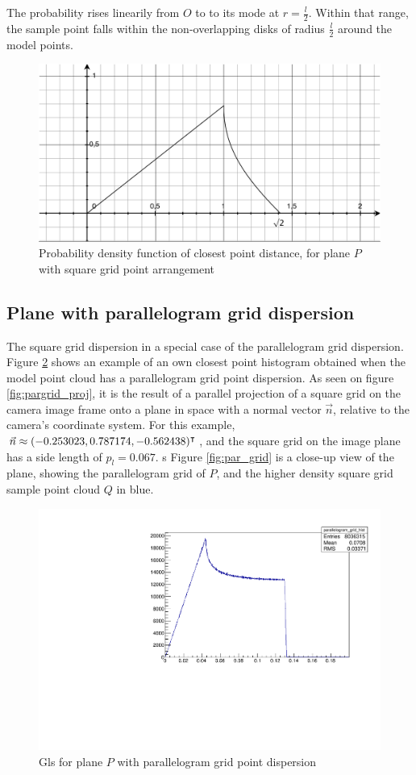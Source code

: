 The probability rises linearily from $O$ to to its mode at $r = \frac{l}{2}$. Within that range, the sample point falls within the non-overlapping disks of radius $\frac{l}{2}$ around the model points.

\begin{figure}[p]
\centering
\includegraphics[width=.5\textwidth]{fig/sq_grid_d.pdf}
\caption{Probability density function of closest point distance, for plane $P$ with square grid point arrangement}
\label{fig:sq_grid_d}
\end{figure}


\subsection{Plane with parallelogram grid dispersion}
The square grid dispersion in a special case of the parallelogram grid dispersion. Figure \ref{fig:plane_par_cphist} shows an example of an own closest point histogram obtained when the model point cloud has a parallelogram grid point dispersion. As seen on figure \ref{fig:pargrid_proj}, it is the result of a parallel projection of a square grid on the camera image frame onto a plane in space with a normal vector $\vec{n}$, relative to the camera's coordinate system. For this example, $\vec{n} \approx (-0.253023, 0.787174, -0.562438)^\intercal$, and the square grid on the image plane has a side length of $p_l = 0.067$.
s
Figure \ref{fig:par_grid} is a close-up view of the plane, showing the parallelogram grid of $P$, and the higher density square grid sample point cloud $Q$ in blue.


\begin{figure}[H]
\centering
\includegraphics[width=.5\textwidth]{fig/parallelogram_grid.pdf}
\caption{\gls{Gls} for plane $P$ with parallelogram grid point dispersion}
\label{fig:plane_par_cphist}
\end{figure}

